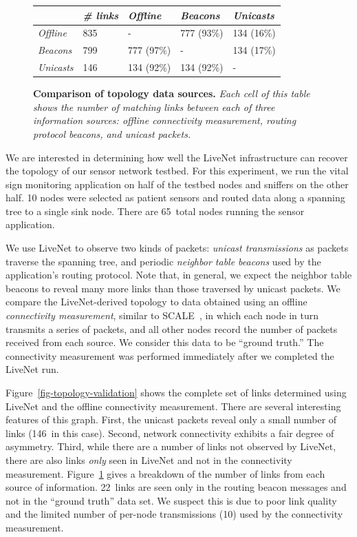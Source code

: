 \begin{figure}[t]
\begin{center}
\begin{small}
\begin{tabular}{|l|l||l|l|l|} \hline
                & {\em \# links} &  {\em Offline} & {\em Beacons}
		& {\em Unicasts} \\ \hline
{\em Offline} & 835 & -  & 777 (93\%) & 134 (16\%) \\ \hline
{\em Beacons}      & 799 & 777 (97\%) & -  & 134 (17\%) \\ \hline
{\em Unicasts}     & 146 & 134 (92\%) & 134 (92\%) & - \\ \hline
\end{tabular}
\end{small}
\end{center}
\caption{\small {\bf Comparison of topology data sources.}
{\em Each cell of this table shows the number of {\em matching} links
between each of three information sources: offline connectivity
measurement, routing protocol beacons, and unicast packets.}}
\label{fig-topology-comparison}
\end{figure}


We are interested in determining how well the LiveNet infrastructure
can recover the topology of our sensor network testbed. For this
experiment, we run the vital sign monitoring application on half of
the testbed nodes and sniffers on the other half. 
10 nodes were selected as patient sensors and
routed data along a spanning tree to a single sink node. There are
65~total nodes running the sensor application.

We use LiveNet to observe two
kinds of packets: {\em unicast transmissions} as packets traverse the
spanning tree, and periodic {\em neighbor table beacons} used by 
the application's routing protocol. Note that, in general, we expect
the neighbor table beacons to reveal many more links
than those traversed by unicast packets. 
We compare the LiveNet-derived topology to data obtained using an 
offline {\em connectivity measurement}, similar to SCALE~\cite{scale}, 
in which each node in turn transmits a series of packets, and all 
other nodes record the number of packets received from each source. 
We consider this data to be ``ground truth.'' The connectivity
measurement was performed immediately after we completed the LiveNet run.

Figure~\ref{fig-topology-validation} shows the complete set of links
determined using LiveNet and the offline connectivity measurement.
There are several interesting features of this graph. First, the
unicast packets reveal only a small number of links
(146~in this case). Second, network connectivity exhibits a fair
degree of asymmetry. Third, while there are a number of links not
observed by LiveNet, there are also links {\em only} seen in LiveNet
and not in the connectivity measurement.
Figure~\ref{fig-topology-comparison} gives a breakdown of the number
of links from each source of information. 22~links are seen only
in the routing beacon messages and not in the ``ground truth'' 
data set. We suspect this is due to poor link quality and the 
limited number of per-node
transmissions (10) used by the connectivity measurement. 


